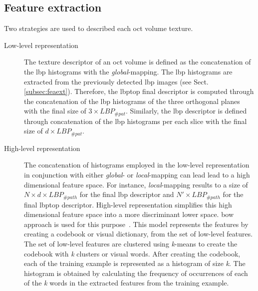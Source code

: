 \subsection{Feature extraction}\label{subsec:fearep}

Two strategies are used to described each \ac{oct} volume texture.

\begin{description}

\item[Low-level representation] The texture descriptor of an \ac{oct} volume is defined as the concatenation of the \ac{lbp} histograms with the \emph{global}-mapping.
The \ac{lbp} histograms are extracted from the previously detected \ac{lbp} images (see Sect.\,\ref{subsec:feaext}).
Therefore, the \ac{lbptop} final descriptor is computed through the concatenation of the \ac{lbp} histograms of the three orthogonal planes with the final size of $3 \times LBP_{\#pat}$.
Similarly, the \ac{lbp} descriptor is defined through concatenation of the \ac{lbp} histograms per each slice with the final size of $d \times LBP_{\#pat}$.

\item[High-level representation] The concatenation of histograms employed in the low-level representation in conjunction with either \emph{global}- or \emph{local}-mapping can lead lead to a high dimensional feature space.
For instance, \emph{local}-mapping results to a size of $N \times d \times LBP_{\#path}$ for the final \ac{lbp} descriptor and $N' \times LBP_{\#path}$ for the final \ac{lbptop} descriptor.
High-level representation simplifies this high dimensional feature space into a more discriminant lower space.
\ac{bow} approach is used for this purpose~\cite{Sivic2003}.
This model represents the features by creating a codebook or visual dictionary, from the set of low-level features.
The set of low-level features are clustered using \textit{k}-means to create the codebook with \textit{k} clusters or visual words.
After creating the codebook, each of the training example is represented as a histogram of size \textit{k}.
The histogram is obtained by calculating the frequency of occurrences of each of the \textit{k} words in the extracted features from the training example.

\end{description}

